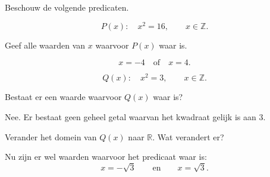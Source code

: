 \documentclass{ximera}
\begin{document}
\begin{oefening}{\oefB}

Beschouw de volgende predicaten.

\begin{question}
\[
P(x):\quad x^2=16,
\qquad x\in\mathbb{Z}.
\]

Geef alle waarden van $x$ waarvoor $P(x)$ waar is.

\begin{oplossing}
\[
x=-4\quad\text{of}\quad x=4.
\]
\end{oplossing}
\end{question}


\begin{question}
\[
Q(x):\quad x^2=3,
\qquad x\in\mathbb{Z}.
\]

Bestaat er een waarde waarvoor $Q(x)$ waar is?

\begin{oplossing}
Nee. Er bestaat geen geheel getal waarvan het kwadraat gelijk is aan
$3$.
\end{oplossing}
\end{question}


\begin{question}
Verander het domein van $Q(x)$ naar $\mathbb{R}$. Wat verandert er?

\begin{oplossing}
Nu zijn er wel waarden waarvoor het predicaat waar is:
\[
x=-\sqrt{3}
\qquad\text{en}\qquad
x=\sqrt{3}.
\]
\end{oplossing}
\end{question}

\end{oefening}



\end{document}
